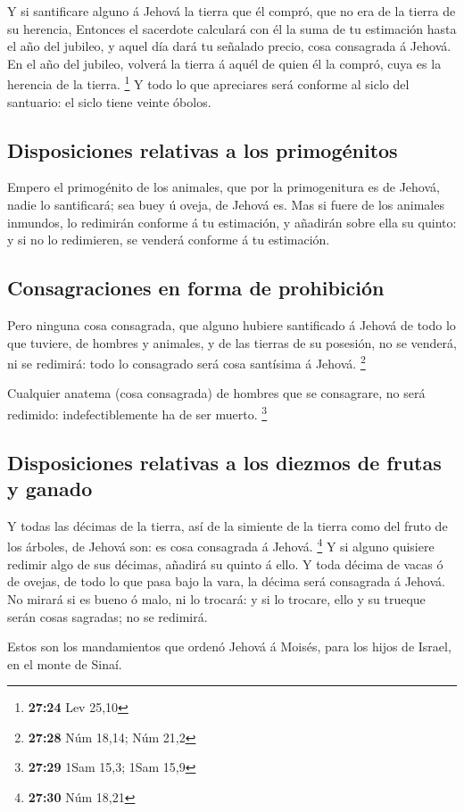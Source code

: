 Y si santificare alguno á Jehová la tierra que él compró,
que no era de la tierra de su herencia,  Entonces el
sacerdote calculará con él la suma de tu estimación hasta el año del
jubileo, y aquel día dará tu señalado precio, cosa consagrada á Jehová.
 En el año del jubileo, volverá la tierra á aquél de quien
él la compró, cuya es la herencia de la tierra. \footnote{\textbf{27:24}
  Lev 25,10}  Y todo lo que apreciares será conforme al
siclo del santuario: el siclo tiene veinte óbolos.

\hypertarget{disposiciones-relativas-a-los-primoguxe9nitos}{%
\subsection{Disposiciones relativas a los
primogénitos}\label{disposiciones-relativas-a-los-primoguxe9nitos}}

 Empero el primogénito de los animales, que por la
primogenitura es de Jehová, nadie lo santificará; sea buey ú oveja, de
Jehová es.  Mas si fuere de los animales inmundos, lo
redimirán conforme á tu estimación, y añadirán sobre ella su quinto: y
si no lo redimieren, se venderá conforme á tu estimación.

\hypertarget{consagraciones-en-forma-de-prohibiciuxf3n}{%
\subsection{Consagraciones en forma de
prohibición}\label{consagraciones-en-forma-de-prohibiciuxf3n}}

 Pero ninguna cosa consagrada, que alguno hubiere
santificado á Jehová de todo lo que tuviere, de hombres y animales, y de
las tierras de su posesión, no se venderá, ni se redimirá: todo lo
consagrado será cosa santísima á Jehová. \footnote{\textbf{27:28} Núm
  18,14; Núm 21,2}

 Cualquier anatema (cosa consagrada) de hombres que se
consagrare, no será redimido: indefectiblemente ha de ser muerto.
\footnote{\textbf{27:29} 1Sam 15,3; 1Sam 15,9}

\hypertarget{disposiciones-relativas-a-los-diezmos-de-frutas-y-ganado}{%
\subsection{Disposiciones relativas a los diezmos de frutas y
ganado}\label{disposiciones-relativas-a-los-diezmos-de-frutas-y-ganado}}

 Y todas las décimas de la tierra, así de la simiente de la
tierra como del fruto de los árboles, de Jehová son: es cosa consagrada
á Jehová. \footnote{\textbf{27:30} Núm 18,21}  Y si alguno
quisiere redimir algo de sus décimas, añadirá su quinto á ello.
 Y toda décima de vacas ó de ovejas, de todo lo que pasa
bajo la vara, la décima será consagrada á Jehová.  No
mirará si es bueno ó malo, ni lo trocará: y si lo trocare, ello y su
trueque serán cosas sagradas; no se redimirá.

 Estos son los mandamientos que ordenó Jehová á Moisés,
para los hijos de Israel, en el monte de Sinaí.
